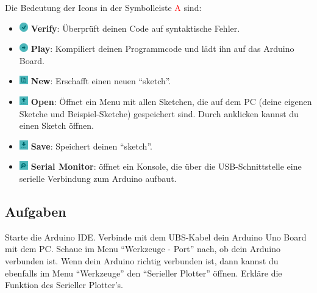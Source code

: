 Die Bedeutung der Icons in der Symbolleiste \textcolor{red}{A} sind:
\begin{itemize}
  \item[] \includegraphics[width=0.03\textwidth]{Kapitel1/Bilder/verify} \textbf{Verify}:  Überprüft deinen Code auf syntaktische Fehler.
  \item[]  \includegraphics[width=0.03\textwidth]{Kapitel1/Bilder/play} \textbf{Play}: Kompiliert deinen Programmcode und lädt ihn auf das Arduino Board.
  \item[] \includegraphics[width=0.03\textwidth]{Kapitel1/Bilder/new} \textbf{New}: Erschafft einen neuen ``sketch''.
  \item[]  \includegraphics[width=0.03\textwidth]{Kapitel1/Bilder/open}   \textbf{Open}: Öffnet ein Menu mit allen Sketchen, die auf dem PC (deine eigenen Sketche und Beispiel-Sketche) gespeichert sind. Durch anklicken kannst du einen Sketch öffnen.
  \item[] \includegraphics[width=0.03\textwidth]{Kapitel1/Bilder/save} \textbf{Save}: Speichert deinen ``sketch''.
  \item[] \includegraphics[width=0.03\textwidth]{Kapitel1/Bilder/serial_monitor} \textbf{Serial Monitor}: öffnet ein Konsole, die über die USB-Schnittstelle eine serielle Verbindung zum Arduino aufbaut. 
\end{itemize}

\subsection{Aufgaben}

Starte die Arduino IDE. Verbinde mit dem UBS-Kabel dein Arduino Uno Board mit dem PC. Schaue im Menu ``Werkzeuge - Port'' nach, ob dein Arduino verbunden ist. Wenn dein Arduino richtig verbunden ist, dann kannst du ebenfalls im Menu ``Werkzeuge'' den ``Serieller Plotter'' öffnen. Erkläre die Funktion des Serieller Plotter's.  


